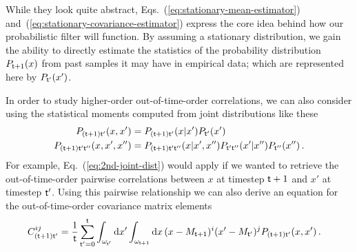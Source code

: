 While they look quite abstract, Eqs.~(\ref{eq:stationary-mean-estimator}) and~(\ref{eq:stationary-covariance-estimator}) express the core idea behind how our probabilistic filter will function. By assuming a stationary distribution, we gain the ability to directly estimate the statistics of the probability distribution $P_{{\sf t}+1}(x)$ from past samples it may have in empirical data; which are represented here by $P_{{\sf t}'}(x')$.

In order to study higher-order out-of-time-order correlations, we can also consider using the statistical moments computed from joint distributions like these
\begin{align}
P_{({\sf t}+1){\sf t}'}(x, x') &= P_{({\sf t}+1){\sf t}'}(x\vert x')P_{{\sf t}'}(x') \label{eq:2nd-joint-dist}\\
P_{({\sf t}+1){\sf t}'{\sf t}''}(x, x', x'') &= P_{({\sf t}+1){\sf t}'{\sf t}''}(x\vert x', x'')P_{{\sf t}'{\sf t}''}(x'\vert x'')P_{{\sf t}''}(x'') \label{eq:3rd-joint-dist}\,.
\end{align}
For example, Eq.~(\ref{eq:2nd-joint-dist}) would apply if we wanted to retrieve the out-of-time-order pairwise correlations between $x$ at timestep ${\sf t}+1$ and $x'$ at timestep ${\sf t}'$. Using this pairwise relationship we can also derive an equation for the out-of-time-order covariance matrix elements
\begin{align}
C_{({\sf t}+1){\sf t}'}^{ij} &= \frac{1}{{\sf t}}\sum_{{\sf t}'=0}^{{\sf t}}\int_{\omega_{{\sf t}'}}{\rm d}x'\int_{\omega_{{\sf t}+1}}{\rm d}x \,(x-M_{{\sf t}+1})^i(x'-M_{{\sf t}'})^j P_{({\sf t}+1){\sf t}'}(x, x') \label{eq:out-of-time-order-covariance-estimator} \,.
\end{align}

